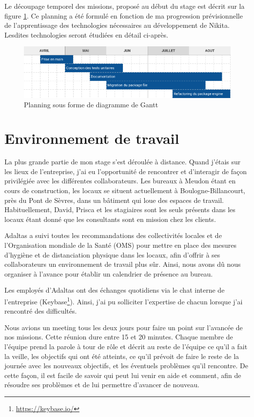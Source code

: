 \documentclass[12pt, french]{report}
\begin{document}
Le découpage temporel des missions, proposé au début du stage est décrit sur la figure \ref{fig:planning}. Ce planning a été formulé en fonction de ma progression prévisionnelle de l'apprentissage des technologies nécessaires au développement de Nikita. Lesdites technologies seront étudiées en détail ci-après.

\begin{figure}[h]
\includegraphics[scale=0.6]{assets/img/planning.png}
\centering
\caption{Planning sous forme de diagramme de Gantt}
\label{fig:planning}
\end{figure}

\section{Environnement de travail}

La plus grande partie de mon stage s'est déroulée à distance. Quand j'étais sur les lieux de l'entreprise, j'ai eu l'opportunité de rencontrer et d'interagir de façon privilégiée avec les différentes collaborateurs. Les bureaux à Meudon étant en cours de construction, les locaux se situent actuellement à Boulogne-Billancourt, près du Pont de Sèvres, dans un bâtiment qui loue des espaces de travail. Habituellement, David, Prisca et les stagiaires sont les seuls présents dans les locaux étant donné que les consultants sont en mission chez les clients.

Adaltas a suivi toutes les recommandations des collectivités locales et de l’Organisation mondiale de la Santé (OMS) pour mettre en place des mesures d’hygiène et de distanciation physique dans les locaux, afin d’offrir à ses collaborateurs un environnement de travail plus sûr. Ainsi, nous avons dû nous organiser à l'avance pour établir un calendrier de présence au bureau.

Les employés d’Adaltas ont des échanges quotidiens via le chat interne de l’entreprise (Keybase\footnote{\href{https://keybase.io/}{https://keybase.io/}}). Ainsi, j'ai pu solliciter l'expertise de chacun lorsque j'ai rencontré des difficultés.

Nous avions un meeting tous les deux jours pour faire un point sur l'avancée de nos missions. Cette réunion dure entre 15 et 20 minutes. Chaque membre de l'équipe prend la parole à tour de rôle et décrit au reste de l’équipe ce qu’il a fait la veille, les objectifs qui ont été atteints, ce qu’il prévoit de faire le reste de la journée avec les nouveaux objectifs, et les éventuels problèmes qu’il rencontre. De cette façon, il est facile de savoir qui peut lui venir en aide et comment, afin de résoudre ses problèmes et de lui permettre d’avancer de nouveau.
\end{document}

